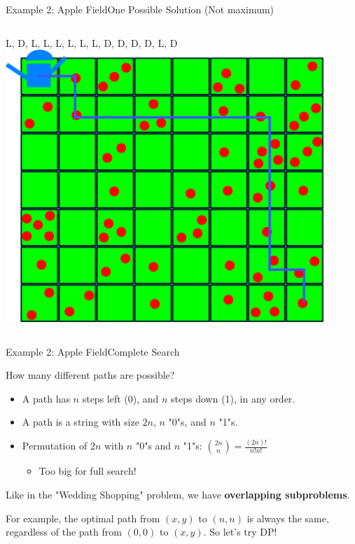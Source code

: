 \begin{frame}{Example 2: Apple Field}{One Possible Solution (Not maximum)}

  \begin{columns}
    L, D, L, L, L, L, L, L, D, D, D, D, L, D
    \includegraphics[width=0.9\textwidth]{../img/applefield-solution}
  \end{columns}
\end{frame}

\begin{frame}{Example 2: Apple Field}{Complete Search}

  \begin{block}{}
    How many different paths are possible?
  \end{block}
  \begin{itemize}
    \item A path has $n$ steps left (0), and $n$ steps down (1), in any order.
    \bigskip

    \item A path is a string with size $2n$, $n$ "0"s, and $n$ "1"s.
    \bigskip

    \item Permutation of $2n$ with $n$ "0"s and $n$ "1"s: $\binom{2n}{n} = \frac{(2n)!}{n!n!}$
    \begin{itemize}
      \item Too big for full search!
    \end{itemize}
  \end{itemize}\bigskip

  Like in the "Wedding Shopping" problem, we have {\bf overlapping subproblems}.
  \bigskip

  For example, the optimal path from $(x,y)$ to $(n,n)$ is always the same, regardless of the path from $(0,0)$ to $(x,y)$. So let's try DP!
\end{frame}


